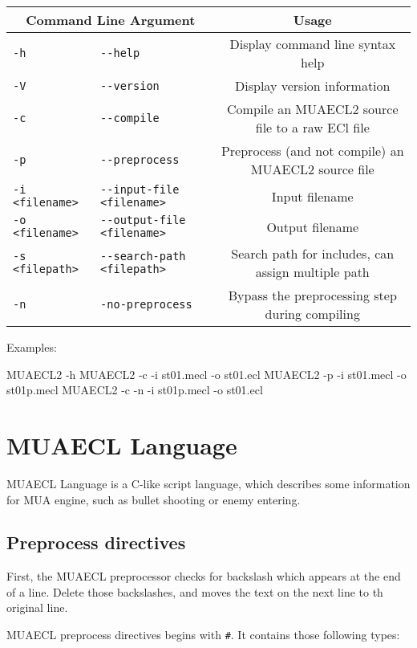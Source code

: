 \documentclass{article}
\begin{document}
\begin{table}[H]
	\centering
	\begin{tabular}{l|l|c}
		\hline
		\multicolumn{2}{c|}{Command Line Argument} & Usage \\\hline
		\verb|-h| & \verb|--help| & Display command line syntax help \\\hline
		\verb|-V| & \verb|--version| & Display version information \\\hline
		\verb|-c| & \verb|--compile| & Compile an MUAECL2 source file to a raw ECl file \\\hline
		\verb|-p| & \verb|--preprocess| & Preprocess (and not compile) an MUAECL2 source file \\\hline
		\verb|-i <filename>| & \verb|--input-file <filename>| & Input filename \\\hline
		\verb|-o <filename>| & \verb|--output-file <filename>| & Output filename \\\hline
		\verb|-s <filepath>| & \verb|--search-path <filepath>| & Search path for includes, can assign multiple path \\\hline
		\verb|-n| & \verb|-no-preprocess| & Bypass the preprocessing step during compiling \\\hline
	\end{tabular}
\end{table}

Examples:

\begin{MUAvbt}
MUAECL2 -h
MUAECL2 -c -i st01.mecl -o st01.ecl
MUAECL2 -p -i st01.mecl -o st01p.mecl
MUAECL2 -c -n -i st01p.mecl -o st01.ecl
\end{MUAvbt}

\section{MUAECL Language}

MUAECL Language is a C-like script language, which describes some information for MUA engine, such as bullet shooting or enemy entering.

\subsection{Preprocess directives}

First, the MUAECL preprocessor checks for backslash which appears at the end of a line. Delete those backslashes, and moves the text on the next line to th original line.

MUAECL preprocess directives begins with \verb|#|. It contains those following types:
\end{document}
